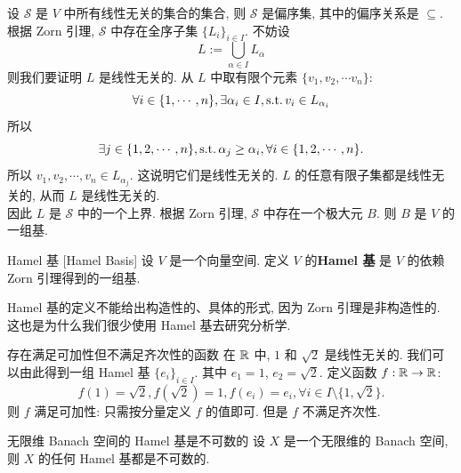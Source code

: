         \begin{prf}
            设 \(\mathcal{S}\) 是 \(V\) 中所有线性无关的集合的集合, 则 \(\mathcal{S}\) 是偏序集, 其中的偏序关系是 \(\subseteq\). \\
            根据 Zorn 引理, \(\mathcal{S}\) 中存在全序子集 \(\{L_i\}_{i\in I}\). 不妨设
            \[L:=\bigcup_{\alpha\in I}L_\alpha\]
            则我们要证明 \(L\) 是线性无关的. 从 \(L\) 中取有限个元素 \(\{v_1,v_2, \cdots v_n\}\):
            \[\forall i\in\{1,\cdots,n\},\exists \alpha_i\in I,\operatorname{\text{s.t.}} v_i\in L_{\alpha_i}\]
            所以
            \[\exists j \in \{1, 2, \cdots, n\}, \operatorname{\text{s.t.}} \alpha_j \geq \alpha_i, \forall i \in \{1, 2, \cdots, n\}. \]
            所以 $v_1, v_2, \cdots, v_n \in L_{\alpha_j}$. 这说明它们是线性无关的. \(L\) 的任意有限子集都是线性无关的, 从而 \(L\) 是线性无关的. \\
            因此 \(L\) 是 \(\mathcal{S}\) 中的一个上界. 根据 Zorn 引理, \(\mathcal{S}\) 中存在一个极大元 \(B\). 则 \(B\) 是 \(V\) 的一组基.
        \end{prf}

        \begin{dfn}
            {Hamel 基}
            [Hamel Basis]
            设 \(V\) 是一个向量空间. 定义 \(V\) 的\textbf{Hamel 基} 是 \(V\) 的依赖 Zorn 引理得到的一组基.
        \end{dfn}

        \begin{rmk}
            [Dedicatia]
            Hamel 基的定义不能给出构造性的、具体的形式, 因为 Zorn 引理是非构造性的. 这也是为什么我们很少使用 Hamel 基去研究分析学.
        \end{rmk}

        \begin{ins}
            {存在满足可加性但不满足齐次性的函数}
            在 \(\operatorname{\mathbb{R}}\) 中, \(1\) 和 \(\sqrt{2}\) 是线性无关的. 我们可以由此得到一组 Hamel 基 \(\{e_i\}_{i\in I}\). 其中 \(e_1=1\), \(e_2=\sqrt{2}\). 定义函数 \(f:\operatorname{\mathbb{R}}\to\operatorname{\mathbb{R}}\):
            \[f(1)=\sqrt{2}, f(\sqrt{2})=1, f(e_i)=e_i, \forall i \in I\setminus\{1,\sqrt{2}\}. \]
            则 \(f\) 满足可加性: 只需按分量定义 \(f\) 的值即可. 但是 \(f\) 不满足齐次性. 
        \end{ins}

        \begin{thm}
            {无限维 Banach 空间的 Hamel 基是不可数的}
            设 \(X\) 是一个无限维的 Banach 空间, 则 \(X\) 的任何 Hamel 基都是不可数的.
        \end{thm}

